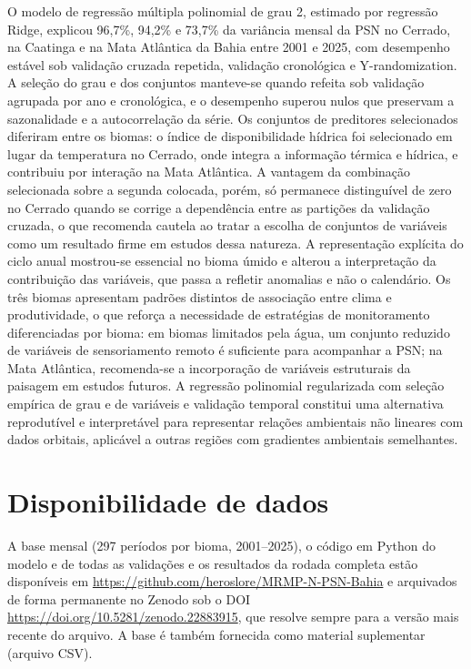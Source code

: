 \documentclass[a4paper,fleqn]{cas-sc}
\begin{document}
O modelo de regressão múltipla polinomial de grau 2, estimado por regressão Ridge, explicou 96,7\%, 94,2\% e 73,7\% da variância mensal da PSN no Cerrado, na Caatinga e na Mata Atlântica da Bahia entre 2001 e 2025, com desempenho estável sob validação cruzada repetida, validação cronológica e Y-randomization. A seleção do grau e dos conjuntos manteve-se quando refeita sob validação agrupada por ano e cronológica, e o desempenho superou nulos que preservam a sazonalidade e a autocorrelação da série. Os conjuntos de preditores selecionados diferiram entre os biomas: o índice de disponibilidade hídrica foi selecionado em lugar da temperatura no Cerrado, onde integra a informação térmica e hídrica, e contribuiu por interação na Mata Atlântica. A vantagem da combinação selecionada sobre a segunda colocada, porém, só permanece distinguível de zero no Cerrado quando se corrige a dependência entre as partições da validação cruzada, o que recomenda cautela ao tratar a escolha de conjuntos de variáveis como um resultado firme em estudos dessa natureza. A representação explícita do ciclo anual mostrou-se essencial no bioma úmido e alterou a interpretação da contribuição das variáveis, que passa a refletir anomalias e não o calendário. Os três biomas apresentam padrões distintos de associação entre clima e produtividade, o que reforça a necessidade de estratégias de monitoramento diferenciadas por bioma: em biomas limitados pela água, um conjunto reduzido de variáveis de sensoriamento remoto é suficiente para acompanhar a PSN; na Mata Atlântica, recomenda-se a incorporação de variáveis estruturais da paisagem em estudos futuros. A regressão polinomial regularizada com seleção empírica de grau e de variáveis e validação temporal constitui uma alternativa reprodutível e interpretável para representar relações ambientais não lineares com dados orbitais, aplicável a outras regiões com gradientes ambientais semelhantes.

\section*{Disponibilidade de dados}
A base mensal (297 períodos por bioma, 2001--2025), o código em Python do modelo e de todas as validações e os resultados da rodada completa estão disponíveis em \url{https://github.com/heroslore/MRMP-N-PSN-Bahia} e arquivados de forma permanente no Zenodo sob o DOI \url{https://doi.org/10.5281/zenodo.22883915}, que resolve sempre para a versão mais recente do arquivo. A base é também fornecida como material suplementar (arquivo CSV).
\end{document}
